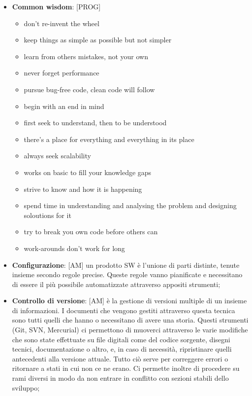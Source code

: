 \begin{itemize}
		\item \textbf{Common wisdom}: [PROG]
			\begin{itemize}
				\item don't re-invent the wheel
				\item keep things as simple as possible but not simpler
				\item learn from others mistakes, not your own
				\item never forget performance
				\item pursue bug-free code, clean code will follow
				\item begin with an end in mind
				\item first seek to understand, then to be understood
				\item there's a place for everything and everything in its place
				\item always seek scalability
				\item works on basic to fill your knowledge gaps
				\item strive to know and how it is happening
				\item spend time in understanding and analysing the problem and designing soloutions for it
				\item try to break you own code before others can
				\item work-arounds don't work for long
			\end{itemize}

		\item \textbf{Configurazione}: [AM] un prodotto SW è l'unione di parti distinte, tenute insieme secondo regole precise. Queste regole vanno pianificate e necessitano di essere il più possibile automatizzate attraverso appositi strumenti;

		\item \textbf{Controllo di versione}: [AM]  è la gestione di versioni multiple di un insieme di informazioni. I documenti che vengono gestiti attraverso questa tecnica sono tutti quelli che hanno o necessitano di avere una storia.\newline
			Questi strumenti (Git, SVN, Mercurial) ci permettono di muoverci attraverso le varie modifiche che sono state effettuate su file digitali come del codice sorgente, disegni tecnici, documentazione o altro, e, in caso di necessità, ripristinare quelli antecedenti alla versione attuale. \newline
			Tutto ciò serve per correggere errori o ritornare a stati in cui non ce ne erano. Ci permette inoltre di procedere su rami diversi in modo da non entrare in conflitto con sezioni stabili dello sviluppo;


\end{itemize}
